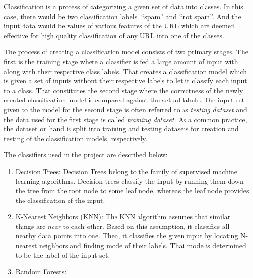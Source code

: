 \documentclass[conference]{IEEEtran}
\begin{document}
\par Classification is a process of categorizing a given set of data into classes.
In this case, there would be two classification labels: ``spam'' and ``not spam''.
And the input data would be values of various features of the URL which are deemed effective for high quality classification of any URL into one of the classes.


\par The process of creating a classification model consists of two primary stages.
The first is the training stage where a classifier is fed a large amount of input with along with their respective class labels.
That creates a classification model which is given a set of inputs without their respective labels to let it classify each input to a class.
That constitutes the second stage where the correctness of the newly created classification model is compared against the actual labels.
The input set given to the model for the second stage is often referred to as \emph{testing dataset} and the data used for the first stage is called \emph{training dataset}.
As a common practice, the dataset on hand is split into training and testing datasets for creation and testing of the classification models, respectively.

\par The classifiers used in the project are described below:
\begin{enumerate}
    \item Decision Trees:
          Decision Trees belong to the family of supervised machine learning algorithms.
          Decision trees classify the input by running them down the tree from the root node to some leaf node, whereas the leaf node provides the classification of the input.
    \item K-Nearest Neighbors (KNN):
          The KNN algorithm assumes that similar things are \emph{near} to each other.
          Based on this assumption, it classifies all nearby data points into one.
          Then, it classifies the given input by locating N-nearest neighbors and finding mode of their labels.
          That mode is determined to be the label of the input set.
    \item Random Forests:
\end{enumerate}
\end{document}
